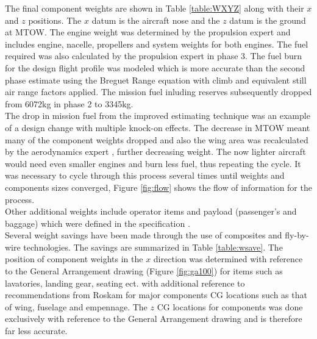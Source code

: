 \documentclass[11pt]{article}
\begin{document}
The final component weights are shown in Table \ref{table:WXYZ} along with their $x$ and $z$ positions. The $x$ datum is the aircraft nose and the $z$ datum is the ground at MTOW. The engine weight was determined by the propulsion expert and includes engine, nacelle, propellers and system weights for both engines. The fuel required was also calculated by the propulsion expert in phase 3. The fuel burn for the design flight profile was modeled which is more accurate than the second phase estimate using the Breguet Range equation with climb and equivalent still air range factors applied. The mission fuel inluding reserves subsequently dropped from 6072kg in phase 2 to 3345kg. \\
The drop in mission fuel from the improved estimating technique was an example of a design change with multiple knock-on effects. The decrease in MTOW meant many of the component weights dropped and also the wing area was recalculated by the aerodynamics expert \cite{kit}, further decreasing weight. The now lighter aircraft would need even smaller engines and burn less fuel, thus repeating the cycle. It was necessary to cycle through this process several times until weights and components sizes converged, Figure \ref{fig:flow} shows the flow of information for the process. \\
Other additional weights include operator items and payload (passenger's and baggage) which were defined in the specification \cite{SPEC}.\\
Several weight savings have been made through the use of composites and fly-by-wire technologies. The savings are summarized in Table \ref{table:wsave}.
The position of component weights in the $x$ direction was determined with reference to the General Arrangement drawing (Figure \ref{fig:ga100}) for items such as lavatories, landing gear, seating ect. with additional reference to recommendations from Roskam \cite{R5} for major components CG locations such as that of wing, fuselage and empennage. The $z$ CG locations for components was done exclusively with reference to the General Arrangement drawing and is therefore far less accurate.\\
\end{document}

